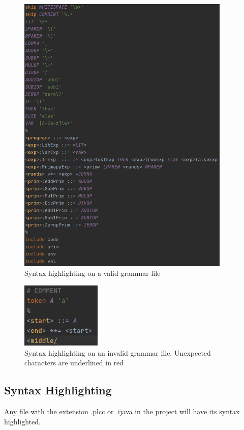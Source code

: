 \documentclass[conference, letterpaper]{IEEEtran}
\begin{document}
\begin{figure}[!t]
    \centering
    \includegraphics[width=4in]{syntax.png}
    \caption{Syntax highlighting on a valid grammar file}
    \label{fig:syntax}
\end{figure}
\begin{figure}[!t]
    \centering
    \includegraphics[width=1.5in]{syntax_invalid.png}
    \caption{Syntax highlighting on an invalid grammar file. Unexpected characters are underlined in red}
    \label{fig:syntax_invalid}
\end{figure}

\subsection{Syntax Highlighting}\label{subsec:new-.plcc-file-syntax-highlighting}
Any file with the extension .plcc or .ijava in the project will have its syntax highlighted.
\end{document}
